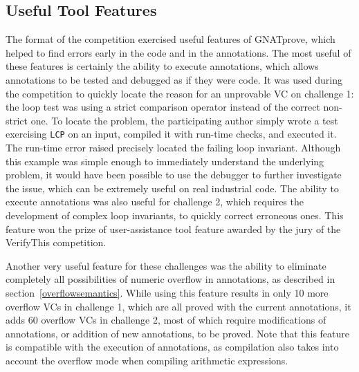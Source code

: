 \documentclass[sttt,final]{svjour}
\newcommand{\gnatprove}{GNATprove\xspace}
\begin{document}

\subsection{Useful Tool Features}

The format of the competition exercised useful features of \gnatprove,
which helped to find errors early in the code and in the
annotations. The most useful of these features is certainly the
ability to execute annotations, which allows annotations to be tested
and debugged as if they were code. It was used during the competition
to quickly locate the reason for an unprovable VC on challenge 1: the
loop test was using a strict comparison operator instead of the
correct non-strict one. To locate the problem, the participating
author simply wrote a test exercising \verb|LCP| on an input, compiled
it with run-time checks, and executed it. The run-time error raised
precisely located the failing loop invariant. Although this example
was simple enough to immediately understand the underlying problem, it
would have been possible to use the debugger to further investigate
the issue, which can be extremely useful on real industrial code. The
ability to execute annotations was also useful for challenge 2, which
requires the development of complex loop invariants, to quickly
correct erroneous ones. This feature won the prize of user-assistance
tool feature awarded by the jury of the VerifyThis competition.

Another very useful feature for these challenges was the ability to eliminate
completely all possibilities of numeric overflow in annotations, as described
in section~\ref{overflowsemantics}. While using this feature results in only 10
more overflow VCs in challenge 1, which are all proved with the current
annotations, it adds 60 overflow VCs in challenge 2, most of which require
modifications of annotations, or addition of new annotations, to be
proved. Note that this feature is compatible with the execution of annotations,
as compilation also takes into account the overflow mode when compiling
arithmetic expressions.
\end{document}
